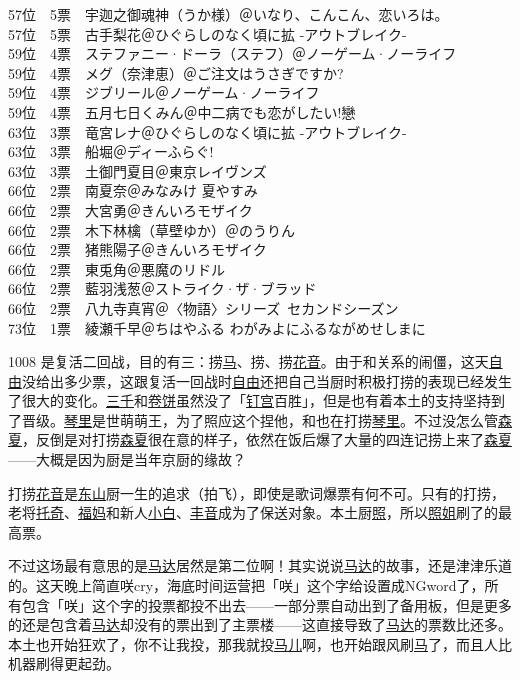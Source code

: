 { 57位　5票　宇迦之御魂神（うか様）＠いなり、こんこん、恋いろは。\\
 57位　5票　古手梨花＠ひぐらしのなく頃に拡 -アウトブレイク-\\
 59位　4票　ステファニー·ドーラ（ステフ）＠ノーゲーム·ノーライフ\\
 59位　4票　メグ（奈津恵）＠ご注文はうさぎですか?\\
 59位　4票　ジブリール＠ノーゲーム·ノーライフ\\
 59位　4票　五月七日くみん＠中二病でも恋がしたい!戀\\
 63位　3票　竜宮レナ＠ひぐらしのなく頃に拡 -アウトブレイク-\\
 63位　3票　船堀＠ディーふらぐ!\\
 63位　3票　土御門夏目＠東京レイヴンズ\\
 66位　2票　南夏奈＠みなみけ 夏やすみ\\
 66位　2票　大宮勇＠きんいろモザイク\\
 66位　2票　木下林檎（草壁ゆか）＠のうりん\\
 66位　2票　猪熊陽子＠きんいろモザイク\\
 66位　2票　東兎角＠悪魔のリドル\\
 66位　2票　藍羽浅葱＠ストライク·ザ·ブラッド\\
 66位　2票　八九寺真宵＠〈物語〉シリーズ~セカンドシーズン\\
 73位　1票　綾瀬千早＠ちはやふる わがみよにふるながめせしまに
}

1008 是复活二回战，目的有三：捞\uline{马}、捞、捞\uline{花音}。由于和关系的闹僵，这天\uline{自由}没给出多少票，这跟复活一回战时\uline{自由}还把自己当厨时积极打捞的表现已经发生了很大的变化。\uline{三千}和\uline{卷饼}虽然没了「\uline{钉宫}百胜」，但是也有着本土的支持坚持到了晋级。\uline{琴里}是世萌萌王，为了照应这个捏他，和也在打捞\uline{琴里}。不过没怎么管\uline{森夏}，反倒是对打捞\uline{森夏}很在意的样子，依然在饭后爆了大量的四连记捞上来了\uline{森夏}——大概是因为厨是当年京厨的缘故？

打捞\uline{花音}是\uline{东山}厨一生的追求（拍飞），即使是歌词爆票有何不可。只有的打捞，老将\uline{托奇}、\uline{福妈}和新人\uline{小白}、\uline{丰音}成为了保送对象。本土厨\uline{照}，所以\uline{照姐}刷了的最高票。

不过这场最有意思的是\uline{马达}居然是第二位啊！其实说说\uline{马达}的故事，还是津津乐道的。这天晚上简直咲cry，海底时间运营把「咲」这个字给设置成NGword了，所有包含「咲」这个字的投票都投不出去——一部分票自动出到了备用板，但是更多的还是包含着\uline{马达}却没有的票出到了主票楼——这直接导致了\uline{马达}的票数比还多。本土也开始狂欢了，你不让我投，那我就投\uline{马儿}啊，也开始跟风刷\uline{马}了，而且人比机器刷得更起劲。

